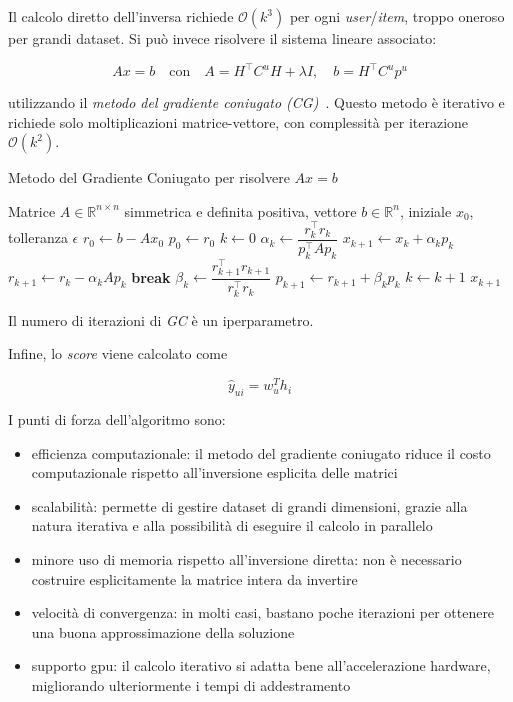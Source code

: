 Il calcolo diretto dell'inversa richiede $\mathcal{O}(k^3)$ per ogni \textit{user}/\textit{item}, troppo oneroso per grandi dataset. Si può invece risolvere il sistema lineare associato:

\[
A x = b \quad \text{con} \quad A = H^\top C^u H + \lambda I, \quad b = H^\top C^u p^u
\]

utilizzando il \textit{metodo del gradiente coniugato (CG)}~\cite{ALS_opt}. Questo metodo è iterativo e richiede solo moltiplicazioni matrice-vettore, con complessità per iterazione $\mathcal{O}(k^2)$.

\begin{algorithm}[htbp]
    \caption{Metodo del Gradiente Coniugato per risolvere $Ax = b$}
    \begin{algorithmic}[1]
    \Require Matrice $A \in \mathbb{R}^{n \times n}$ simmetrica e definita positiva, vettore $b \in \mathbb{R}^n$, iniziale $x_0$, tolleranza $\epsilon$
    \State $r_0 \gets b - A x_0$
    \State $p_0 \gets r_0$
    \State $k \gets 0$
        \State $\alpha_k \gets \dfrac{r_k^\top r_k}{p_k^\top A p_k}$
        \State $x_{k+1} \gets x_k + \alpha_k p_k$
        \State $r_{k+1} \gets r_k - \alpha_k A p_k$
            \State \textbf{break}
        \EndIf
        \State $\beta_k \gets \dfrac{r_{k+1}^\top r_{k+1}}{r_k^\top r_k}$
        \State $p_{k+1} \gets r_{k+1} + \beta_k p_k$
        \State $k \gets k + 1$
    \EndWhile
    \State \Return $x_{k+1}$
    \end{algorithmic}
\end{algorithm}
    
Il numero di iterazioni di \textit{GC} è un iperparametro.

Infine, lo \textit{score} viene calcolato come

\[
\hat{y}_{ui} = w_u^T h_i
\]

I punti di forza dell'algoritmo sono:
\begin{itemize}
    \item efficienza computazionale: il metodo del gradiente coniugato riduce il costo computazionale rispetto all'inversione esplicita delle matrici
    \item scalabilità: permette di gestire dataset di grandi dimensioni, grazie alla natura iterativa e alla possibilità di eseguire il calcolo in parallelo
    \item minore uso di memoria rispetto all'inversione diretta: non è necessario costruire esplicitamente la matrice intera da invertire
    \item velocità di convergenza: in molti casi, bastano poche iterazioni per ottenere una buona approssimazione della soluzione
    \item supporto gpu: il calcolo iterativo si adatta bene all'accelerazione hardware, migliorando ulteriormente i tempi di addestramento
\end{itemize}

